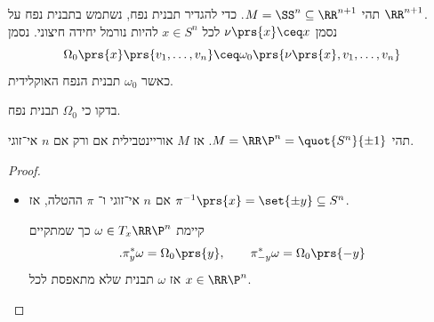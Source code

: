 \documentclass[a4paper,10pt,twoside,openany]{book}
\begin{document}
\begin{example}
תהי
$M = \SS^n \subseteq \RR^{n+1}$.
כדי להגדיר תבנית נפח, נשתמש בתבנית נפח על
$\RR^{n+1}$.\\
נסמן
$\nu \prs{x} \ceq x$
לכל
$x \in S^n$
להיות נורמל יחידה חיצוני.
נסמן
\[\Omega_0\prs{x} \prs{v_1, \ldots, v_n} \ceq \omega_0\prs{\nu\prs{x}, v_1, \ldots, v_n}\]
כאשר
$\omega_0$
תבנית הנפח האוקלידית.
\end{example}
\begin{exercise}
בדקו כי
$\Omega_0$
תבנית נפח.
\end{exercise}
\begin{theorem}
תהי
$M = \RR\P^n = \quot{S^n}{\pm 1}$.
אז
$M$
אוריינטבילית אם ורק אם
$n$
אי־זוגי.
\end{theorem}
\begin{proof}
\begin{itemize}
\item אם
$n$
אי־זוגי ו־%
$\pi$
ההטלה, אז
$\pi^{-1}\prs{x} = \set{\pm y} \subseteq S^n$.
\begin{exercise}
קיימת
$\omega \in T_x \RR\P^n$
כך שמתקיים
\[\text{.}\pi_y^*\omega = \Omega_0\prs{y}, \qquad \pi_{-y}^* \omega = \Omega_0\prs{-y}\]
אז
$\omega$
תבנית שלא מתאפסת לכל
$x \in \RR\P^n$.


\end{exercise}
\end{itemize}
\end{proof}
\end{document}

